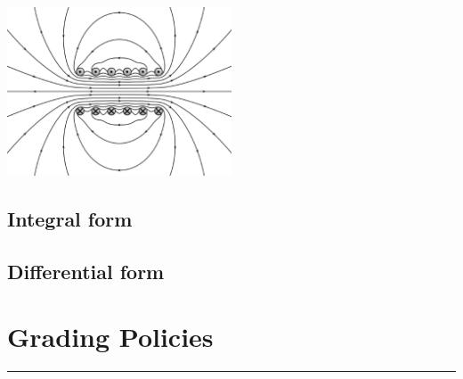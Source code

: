 \documentclass[letterpaper,10pt,fleqn]{article}
\numberwithin{equation}{section}
\begin{document}
\centerline{\includegraphics[width=0.5\textwidth]{maxwell.eps}}

\subsection{Integral form}

\subsection{Differential form}

\newpage

\section*{Grading Policies}
\hrule
\end{document}
